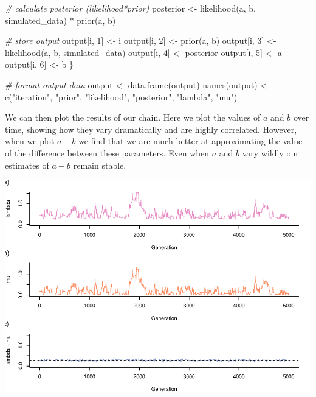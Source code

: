 \documentclass[
]{article}
\newenvironment{Shaded}{\begin{snugshade}}{\end{snugshade}}
\newcommand{\CommentTok}[1]{\textcolor[rgb]{0.56,0.35,0.01}{\textit{#1}}}
\newcommand{\DecValTok}[1]{\textcolor[rgb]{0.00,0.00,0.81}{#1}}
\newcommand{\FunctionTok}[1]{\textcolor[rgb]{0.00,0.00,0.00}{#1}}
\newcommand{\NormalTok}[1]{#1}
\newcommand{\OtherTok}[1]{\textcolor[rgb]{0.56,0.35,0.01}{#1}}
\newcommand{\SpecialCharTok}[1]{\textcolor[rgb]{0.00,0.00,0.00}{#1}}
\newcommand{\StringTok}[1]{\textcolor[rgb]{0.31,0.60,0.02}{#1}}
\begin{document}
\begin{Shaded}
\begin{Highlighting}[]
    \CommentTok{\# calculate posterior (likelihood*prior)}
\NormalTok{    posterior }\OtherTok{\textless{}{-}} \FunctionTok{likelihood}\NormalTok{(a, b, simulated\_data) }\SpecialCharTok{*} \FunctionTok{prior}\NormalTok{(a,}
\NormalTok{        b)}

    \CommentTok{\# store output}
\NormalTok{    output[i, }\DecValTok{1}\NormalTok{] }\OtherTok{\textless{}{-}}\NormalTok{ i}
\NormalTok{    output[i, }\DecValTok{2}\NormalTok{] }\OtherTok{\textless{}{-}} \FunctionTok{prior}\NormalTok{(a, b)}
\NormalTok{    output[i, }\DecValTok{3}\NormalTok{] }\OtherTok{\textless{}{-}} \FunctionTok{likelihood}\NormalTok{(a, b, simulated\_data)}
\NormalTok{    output[i, }\DecValTok{4}\NormalTok{] }\OtherTok{\textless{}{-}}\NormalTok{ posterior}
\NormalTok{    output[i, }\DecValTok{5}\NormalTok{] }\OtherTok{\textless{}{-}}\NormalTok{ a}
\NormalTok{    output[i, }\DecValTok{6}\NormalTok{] }\OtherTok{\textless{}{-}}\NormalTok{ b}
\NormalTok{\}}

\CommentTok{\# format output data}
\NormalTok{output }\OtherTok{\textless{}{-}} \FunctionTok{data.frame}\NormalTok{(output)}
\FunctionTok{names}\NormalTok{(output) }\OtherTok{\textless{}{-}} \FunctionTok{c}\NormalTok{(}\StringTok{"iteration"}\NormalTok{, }\StringTok{"prior"}\NormalTok{, }\StringTok{"likelihood"}\NormalTok{, }\StringTok{"posterior"}\NormalTok{,}
    \StringTok{"lambda"}\NormalTok{, }\StringTok{"mu"}\NormalTok{)}
\end{Highlighting}
\end{Shaded}

We can then plot the results of our chain. Here we plot the values of
\(a\) and \(b\) over time, showing how they vary dramatically and are
highly correlated. However, when we plot \(a-b\) we find that we are
much better at approximating the value of the difference between these
parameters. Even when \(a\) and \(b\) vary wildly our estimates of
\(a-b\) remain stable.

\includegraphics{supplement_files/figure-latex/plot1-1.pdf}
\end{document}
